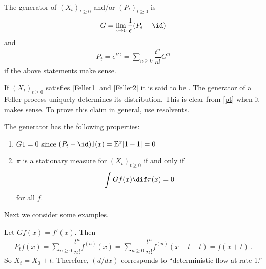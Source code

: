 \documentclass[../../../Master/AppliedStochastics.tex]{subfiles}
\begin{document}
\begin{definition}
    The generator of $(X_t)_{t \geq 0}$ and/or $(P_t)_{t \geq 0}$ is
    $$\begin{aligned}
        G = \lim_{\epsilon \to 0} \dfrac{1}{\epsilon} (P_{\epsilon} - \id)
    \end{aligned}$$
        and 
    $$\begin{aligned}\label{pt}
        P_t = e^{tG} = \sum_{n \geq 0} \dfrac{t^{n}}{n!} G^n
    \end{aligned}$$
    if the above statements make sense. 
\end{definition}


\begin{note}
    If $(X_t)_{t \geq 0}$ satisfies \eqref{Feller1} and \eqref{Feller2}
        it is said to be .
    The generator of a Feller process uniquely determines its distribution. This is clear from \eqref{pt} when it makes sense.
    To prove this claim in general, use resolvents. 
\end{note}


The generator has the following properties:
\begin{enumerate}
    \item
        $G 1 = 0$ since $(P_t - \id)1(x) = \E^{x}[1 - 1] = 0$
    
    \item
    $\pi$ is a stationary measure for $(X_t)_{t \geq 0}$ if and only if 
    $$\begin{aligned}
        \int G f(x) \dif \pi(x) = 0
    \end{aligned}$$
        for all $f$. 
\end{enumerate}


Next we consider some examples. 
\begin{example}
    Let $Gf(x) = f'(x)$.
    Then 
    $$\begin{aligned}
        P_t f(x) = \sum_{n \geq 0} \dfrac{t^{n}}{n!} f^{(n)}(x)
                 = \sum_{n \geq 0} \dfrac{t^{n}}{n!} f^{(n)}(x + t - t)
                 = f(x+t)\,.
    \end{aligned}$$
    So $X_t = X_0 + t$.
    Therefore, $(d/dx)$ corresponds to ``deterministic flow at rate 1.''
\end{example}
\end{document}
